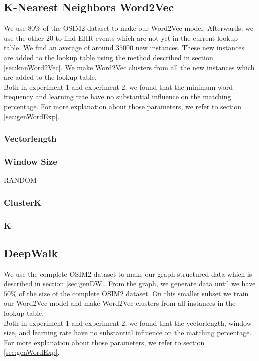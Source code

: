 \subsection{K-Nearest Neighbors Word2Vec}

We use $80$\% of the OSIM2 dataset to make our Word2Vec model. Afterwards, we use the other $20$ to find EHR events which are not yet in the current lookup table. We find an average of around $35 000$ new instances. These new instances are added to the lookup table using the method described in section \ref{sec:knnWord2Vec}. We make Word2Vec clusters from all the new instances which are added to the lookup table. \\
Both in experiment $1$ and experiment $2$, we found that the minimum word frequency and learning rate have no substantial influence on the matching percentage. For more explanation about those parameters, we refer to section \ref{sec:genWordExp}. \\

\subsubsection{Vectorlength}



\subsubsection{Window Size}

RANDOM

\subsubsection{ClusterK}



\subsubsection{K}



\subsection{DeepWalk}

We use the complete OSIM2 dataset to make our graph-structured data which is described in section \ref{sec:genDW}. From the graph, we generate data until we have $50$\% of the size of the complete OSIM2 dataset. On this smaller subset we train our Word2Vec model and make Word2Vec clusters from all instances in the lookup table. \\
Both in experiment $1$ and experiment $2$, we found that the vectorlength, window size, and learning rate have no substantial influence on the matching percentage. For more explanation about those parameters, we refer to section \ref{sec:genWordExp}.


